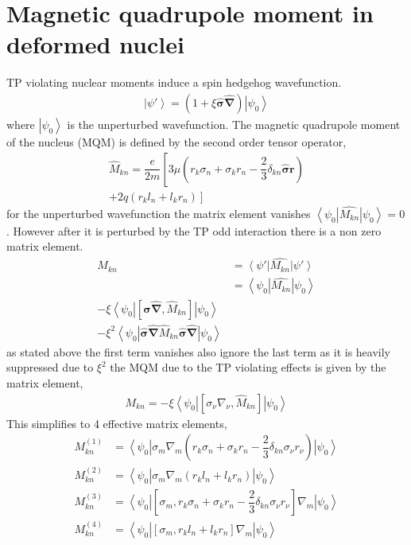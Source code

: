 \documentclass[10pt,a4paper, twoside]{report}
\begin{document}
\section{Magnetic quadrupole moment in deformed nuclei}
TP violating nuclear moments induce a spin hedgehog wavefunction.
\begin{align*}
\left|\psi'\right> = \left(1 + \xi\hat{\boldsymbol{\sigma}}\hat{\boldsymbol{\nabla}}\right)\left|\psi_0\right>
\end{align*}
where $\left|\psi_0\right>$ is the unperturbed wavefunction. The magnetic quadrupole moment of the nucleus (MQM) is defined by the second order tensor operator,
\begin{align*}
\hat{M}_{kn} = \dfrac{e}{2m}\left[3\mu\left(r_k\sigma_n + \sigma_kr_n - \dfrac{2}{3}\delta_{kn}\hat{\boldsymbol{\sigma}}\textbf{r}\right) \right. \\
\left. + 2q\left(r_kl_n + l_kr_n\right)\right]
\end{align*}
for the unperturbed wavefunction the matrix element vanishes $\left<\psi_0\right|\hat{M_{kn}}\left|\psi_0\right> = 0$. However after it is perturbed by the TP odd interaction there is a non zero matrix element.
\begin{align*}
M_{kn} &= \left<\psi'\right|\hat{M_{kn}}\left|\psi'\right> \\
&= \left<\psi_0\right|\hat{M_{kn}}\left|\psi_0\right> \\
-\xi  \left<\psi_0\right|\left[\hat{\boldsymbol{\sigma}}\hat{\boldsymbol{\nabla}}, \hat{M}_{kn}\right]\left|\psi_0\right> \\ - \xi^{2} \left<\psi_0\right|\hat{\boldsymbol{\sigma}}\hat{\boldsymbol{\nabla}}\hat{M}_{kn}\hat{\boldsymbol{\sigma}}\hat{\boldsymbol{\nabla}}\left|\psi_0\right>
\end{align*}
as stated above the first term vanishes also ignore the last term as it is heavily suppressed due to $\xi^2$ the MQM due to the TP violating effects is given by the matrix element,
\begin{align*}
M_{kn} = -\xi  \left<\psi_0\right|\left[\sigma_{\nu}\nabla_{\nu}, \hat{M}_{kn}\right]\left|\psi_0\right>
\end{align*}
This simplifies to 4 effective matrix elements,
\begin{align*}
M^{(1)}_{kn} &= \left<\psi_0\right|\sigma_m\nabla_m\left(r_k\sigma_n + \sigma_kr_n - \dfrac{2}{3}\delta_{kn}\sigma_{\nu}r_{\nu}\right)\left|\psi_0\right> \\
M^{(2)}_{kn} &= \left<\psi_0\right|\sigma_m\nabla_m\left(r_kl_n + l_kr_n\right)\left|\psi_0\right> \\
M^{(3)}_{kn} &=  \left<\psi_0\right|\left[\sigma_m , r_k\sigma_n + \sigma_kr_n -\dfrac{2}{3}\delta_{kn}\sigma_{\nu}r_{\nu}\right]\nabla_m\left|\psi_0\right> \\
M^{(4)}_{kn} &= \left<\psi_0\right|\left[\sigma_m, r_kl_n + l_kr_n\right]\nabla_m\left|\psi_0\right>
\end{align*}
\end{document}
